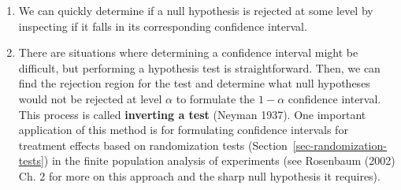 \documentclass[
  13pt,
  letterpaper,
  DIV=11,
  numbers=noendperiod]{scrreprt}
\providecommand{\tightlist}{%
  \setlength{\itemsep}{0pt}\setlength{\parskip}{0pt}}
\theoremstyle{plain}
\theoremstyle{plain}
\theoremstyle{definition}
\theoremstyle{definition}
\theoremstyle{remark}
\begin{document}
\begin{enumerate}
\def\labelenumi{\arabic{enumi}.}
\tightlist
\item
  We can quickly determine if a null hypothesis is rejected at some
  level by inspecting if it falls in its corresponding confidence
  interval.
\item
  There are situations where determining a confidence interval might be
  difficult, but performing a hypothesis test is straightforward. Then,
  we can find the rejection region for the test and determine what null
  hypotheses would not be rejected at level \(\alpha\) to formulate the
  \(1-\alpha\) confidence interval. This process is called
  \textbf{inverting a test} (Neyman 1937). One important application of
  this method is for formulating confidence intervals for treatment
  effects based on randomization tests
  (Section~\ref{sec-randomization-tests}) in the finite population
  analysis of experiments (see Rosenbaum (2002) Ch. 2 for more on this
  approach and the sharp null hypothesis it requires).
\end{enumerate}
\end{document}
